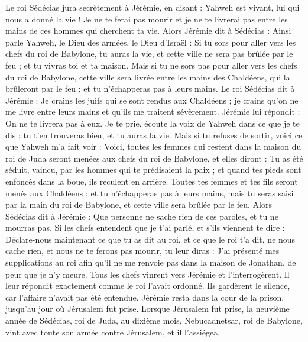 \begin{multicols}{2}
Le roi Sédécias jura secrètement à Jérémie, en disant : Yahweh est vivant, lui qui nous a donné la vie ! Je ne te ferai pas mourir et je ne te livrerai pas entre les mains de ces hommes qui cherchent ta vie.
Alors Jérémie dit à Sédécias : Ainsi parle Yahweh, le Dieu des armées, le Dieu d'Israël : Si tu sors pour aller vers les chefs du roi de Babylone, tu auras la vie, et cette ville ne sera pas brûlée par le feu ; et tu vivras toi et ta maison.
Mais si tu ne sors pas pour aller vers les chefs du roi de Babylone, cette ville sera livrée entre les mains des Chaldéens, qui la brûleront par le feu ; et tu n'échapperas pas à leurs mains.
Le roi Sédécias dit à Jérémie : Je crains les juifs qui se sont rendus aux Chaldéens ; je crains qu'on ne me livre entre leurs mains et qu'ils me traitent sévèrement.
Jérémie lui répondit : On ne te livrera pas à eux. Je te prie, écoute la voix de Yahweh dans ce que je te dis ; tu t'en trouveras bien, et tu auras la vie.
Mais si tu refuses de sortir, voici ce que Yahweh m'a fait voir :
Voici, toutes les femmes qui restent dans la maison du roi de Juda seront menées aux chefs du roi de Babylone, et elles diront : Tu as été séduit, vaincu, par les hommes qui te prédisaient la paix ; et quand tes pieds sont enfoncés dans la boue, ils reculent en arrière.
Toutes tes femmes et tes fils seront menés aux Chaldéens ; et tu n'échapperas pas à leurs mains, mais tu seras saisi par la main du roi de Babylone, et cette ville sera brûlée par le feu.
Alors Sédécias dit à Jérémie : Que personne ne sache rien de ces paroles, et tu ne mourras pas.
Si les chefs entendent que je t'ai parlé, et s'ils viennent te dire : Déclare-nous maintenant ce que tu as dit au roi, et ce que le roi t’a dit, ne nous cache rien, et nous ne te ferons pas mourir,
tu leur diras : J'ai présenté mes supplications au roi afin qu'il ne me renvoie pas dans la maison de Jonathan, de peur que je n’y meure.
Tous les chefs vinrent vers Jérémie et l'interrogèrent. Il leur répondit exactement comme le roi l’avait ordonné. Ils gardèrent le silence, car l’affaire n’avait pas été entendue.
Jérémie resta dans la cour de la prison, jusqu’au jour où Jérusalem fut prise.
\VerseOne{}Lorsque Jérusalem fut prise, la neuvième année de Sédécias, roi de Juda, au dixième mois, Nebucadnetsar, roi de Babylone, vint avec toute son armée contre Jérusalem, et il l'assiégea.

\end{multicols}
